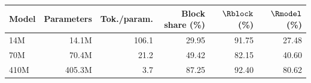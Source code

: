 \begin{tabular}{lrrrrr}
\toprule
Model & Parameters & Tok./param. & Block share (\%) & $\Rblock$ (\%) & $\Rmodel$ (\%) \\
\midrule
14M & 14.1M & 106.1 & 29.95 & 91.75 & 27.48 \\
70M & 70.4M & 21.2 & 49.42 & 82.15 & 40.60 \\
410M & 405.3M & 3.7 & 87.25 & 92.40 & 80.62 \\
\bottomrule
\end{tabular}
